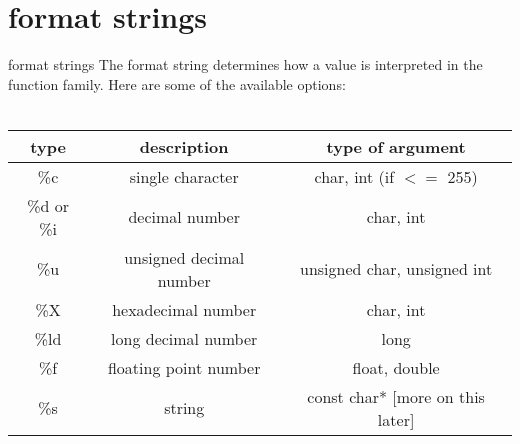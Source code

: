 \documentclass[10pt,graphics,aspectratio=169,table]{beamer}
\begin{document}
\section{format strings}
\begin{frame}{format strings}
    The format string determines how a value is interpreted in the  
    function family. Here are some of the available options: \\ \ \\
    \begin{tabular}{|c|c|c|}
        \hline
        \textbf{type} & \textbf{description} & \textbf{type of argument} \\\hline
        \%c & single character & char, int (if $<=$ 255) \\\hline
        \%d or \%i & decimal number & char, int \\\hline
        \%u & unsigned decimal number & unsigned char, unsigned int \\\hline
        \%X & hexadecimal number & char, int \\\hline
        \%ld & long decimal number & long \\\hline
        \%f & floating point number & float, double \\\hline
        \%s & string & const char* [more on this later] \\\hline
    \end{tabular}
\end{frame}
\end{document}
